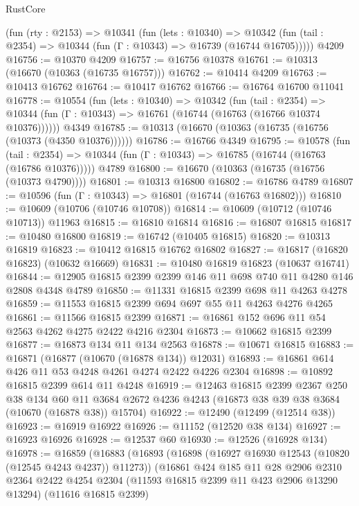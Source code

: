 \begin{lexlean}{RustCore}
\begin{coremodule}
    (fun (rty : @2153) =>
    @10341
      (fun (lets : @10340) =>
      @10342 (fun (tail : @2354) => @10344 (fun (Γ : @10343) => @16739 (@16744 @16705)))))
    @4209
@16756 := @10370 @4209
@16757 := @16756 @10378
@16761 := @10313 (@16670 (@10363 (@16735 @16757)))
@16762 := @10414 @4209
@16763 := @10413 @16762
@16764 := @10417 @16762
@16766 := @16764 @16700 @11041
@16778 := @10554
    (fun (lets : @10340) =>
    @10342
      (fun (tail : @2354) =>
      @10344 (fun (Γ : @10343) => @16761 (@16744 (@16763 (@16766 @10374 @10376))))))
    @4349
@16785 := @10313 (@16670 (@10363 (@16735 (@16756 (@10373 (@4350 @10376))))))
@16786 := @16766 @4349
@16795 := @10578
    (fun (tail : @2354) => @10344 (fun (Γ : @10343) => @16785 (@16744 (@16763 (@16786 @10376)))))
    @4789
@16800 := @16670 (@10363 (@16735 (@16756 (@10373 @4790))))
@16801 := @10313 @16800
@16802 := @16786 @4789
@16807 := @10596 (fun (Γ : @10343) => @16801 (@16744 (@16763 @16802)))
@16810 := @10609 (@10706 (@10746 @10708))
@16814 := @10609 (@10712 (@10746 @10713)) @11963
@16815 := @16810 @16814
@16816 := @16807 @16815
@16817 := @10480 @16800
@16819 := @16742 (@10405 @16815)
@16820 := @10313 @16819
@16823 := @10412 @16815 @16762 @16802
@16827 := @16817 (@16820 @16823) (@10632 @16669)
@16831 := @10480 @16819 @16823 (@10637 @16741)
@16844 := @12905 @16815 @2399 @2399 @146 @11 @698 @740 @11 @4280 @146 @2808 @4348 @4789
@16850 := @11331 @16815 @2399 @698 @11 @4263 @4278
@16859 := @11553 @16815 @2399 @694 @697 @55 @11 @4263 @4276 @4265
@16861 := @11566 @16815 @2399
@16871 := @16861 @152 @696 @11 @54 @2563 @4262 @4275 @2422 @4216 @2304
@16873 := @10662 @16815 @2399
@16877 := @16873 @134 @11 @134 @2563
@16878 := @10671 @16815
@16883 := @16871 (@16877 (@10670 (@16878 @134)) @12031)
@16893 := @16861 @614 @426 @11 @53 @4248 @4261 @4274 @2422 @4226 @2304
@16898 := @10892 @16815 @2399 @614 @11 @4248
@16919 := @12463
    @16815
    @2399
    @2367
    @250
    @38
    @134
    @60
    @11
    @3684
    @2672
    @4236
    @4243
    (@16873 @38 @39 @38 @3684 (@10670 (@16878 @38)) @15704)
@16922 := @12490 (@12499 (@12514 @38))
@16923 := @16919 @16922
@16926 := @11152 (@12520 @38 @134)
@16927 := @16923 @16926
@16928 := @12537 @60
@16930 := @12526 (@16928 @134)
@16978 := @16859
    (@16883
      (@16893
        (@16898 (@16927 @16930 @12543 (@10820 (@12545 @4243 @4237)) @11273))
        (@16861
          @424
          @185
          @11
          @28
          @2906
          @2310
          @2364
          @2422
          @4254
          @2304
          (@11593 @16815 @2399 @11 @423 @2906 @13290 @13294)
          (@11616 @16815 @2399)

\end{coremodule}
\end{lexlean}
